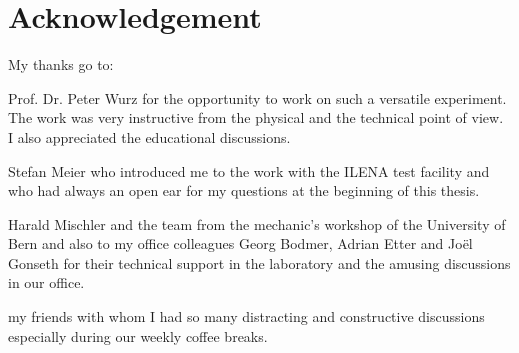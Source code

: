 \documentclass[a4paper, 12pt, abstracton]{scrartcl}
\begin{document}
	\section*{Acknowledgement} %
	
	My thanks go to:
	
	Prof. Dr. Peter Wurz for the opportunity to work on such a versatile experiment. The work was very instructive from the physical and the technical point of view. I also appreciated the educational discussions.
	
	Stefan Meier who introduced me to the work with the ILENA test facility and who had always an open ear for my questions at the beginning of this thesis.
		
	Harald Mischler and the team from the mechanic's workshop of the University of Bern and also to my office colleagues Georg Bodmer, Adrian Etter and Joël Gonseth for their technical support in the laboratory and the amusing discussions in our office.
	
	my friends with whom I had so many distracting and constructive discussions especially during our weekly coffee breaks.
	
	\newpage
	\thispagestyle{empty}
	\null
	\newpage
	
	
	
\end{document}
